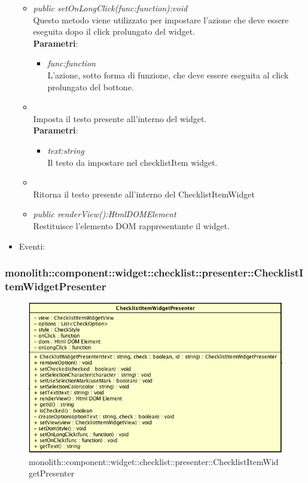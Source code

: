 \begin{itemize}
\begin{itemize}
	\item \textit{public setOnLongClick(func:function):void}\\
		Questo metodo viene utilizzato per impostare l'azione che deve essere eseguita dopo il click prolungato del widget.
		\\ \textbf{Parametri}: \begin{itemize}
		\item \textit{func:function}\\
		L'azione, sotto forma di funzione, che deve essere eseguita al click prolungato del bottone.
		\end{itemize}
	\item {}\\
	Imposta il testo presente all'interno del widget.
		\\ \textbf{Parametri}: \begin{itemize}
		\item \textit{text:string}\\
		Il testo da impostare nel checklistItem widget.
		\end{itemize}
	\item {}\\
	Ritorna il testo presente all'interno del ChecklistItemWidget
	\item \textit{public renderView():HtmlDOMElement}\\
	Restituisce l'elemento DOM rappresentante il widget.
	\end{itemize}
\item{Eventi}:
\end{itemize}

\subsubsection{monolith::component::widget::checklist::presenter::ChecklistItemWidgetPresenter}

\label{monolith::component::widget::checklist::presenter::ChecklistItemWidgetPresenter}
\begin{figure}[H]
	\centering
	\includegraphics[scale=0.5]{Sezioni/SottosezioniST/img/ChecklistItemWidgetPresenter.png}
	\caption{monolith::component::widget::checklist::presenter::ChecklistItemWidgetPresenter}
\end{figure}

